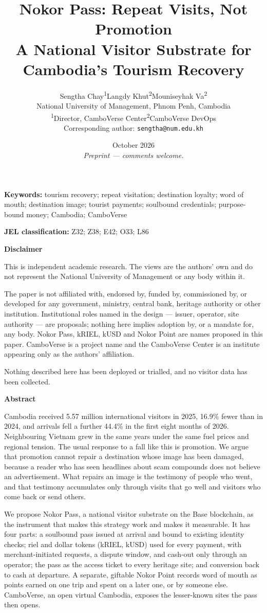 \documentclass[10pt,letterpaper,twocolumn]{article}
\title{\Large Nokor Pass: Repeat Visits, Not Promotion\\[0.3em]
  \large A National Visitor Substrate for Cambodia's Tourism Recovery}
\author{%
  Sengtha Chay\textsuperscript{1}\qquad Langdy Khut\textsuperscript{2}\qquad Mouniseyhak Va\textsuperscript{2}\\[0.6em]
  \normalsize National University of Management, Phnom Penh, Cambodia\\[0.6em]
  \small\textsuperscript{1}Director, CamboVerse Center\qquad \textsuperscript{2}CamboVerse DevOps\\[0.6em]
  \small Corresponding author: \texttt{sengtha@num.edu.kh}}
\date{\normalsize October 2026\\[0.2em]\emph{Preprint --- comments welcome.}}
\begin{document}
\twocolumn[
  \begin{@twocolumnfalse}
    \maketitle
    \vspace{0.5em}
  \end{@twocolumnfalse}
]
\thispagestyle{plain}

{\small
\noindent\textbf{Keywords:} tourism recovery; repeat visitation; destination
loyalty; word of mouth; destination image; tourist payments; soulbound
credentials; purpose-bound money; Cambodia; CamboVerse

\smallskip
\noindent\textbf{JEL classification:} Z32; Z38; E42; O33; L86

\medskip
\noindent\textbf{Disclaimer}\par
\noindent This is independent academic research. The views are the authors' own
and do not represent the National University of Management or any body within
it.

The paper is not affiliated with, endorsed by, funded by, commissioned by, or
developed for any government, ministry, central bank, heritage authority or
other institution. Institutional roles named in the design --- issuer, operator,
site authority --- are proposals; nothing here implies adoption by, or a mandate
for, any body. Nokor Pass, kRIEL, kUSD and Nokor Point are names proposed in this
paper. CamboVerse is a project name and the CamboVerse Center is an institute
appearing only as the authors' affiliation.

Nothing described here has been deployed or trialled, and no visitor data has
been collected.

\medskip
\noindent\textbf{Abstract}\par
\noindent Cambodia received 5.57 million international visitors in 2025, 16.9\%
fewer than in 2024, and arrivals fell a further 44.4\% in the first eight months
of 2026. Neighbouring Vietnam grew in the same years under the same fuel prices
and regional tension. The usual response to a fall like this is promotion. We
argue that promotion cannot repair a destination whose image has been damaged,
because a reader who has seen headlines about scam compounds does not believe
an advertisement. What repairs an image is the testimony of people who went,
and that testimony accumulates only through visits that go well and visitors
who come back or send others.

We propose Nokor Pass, a national visitor substrate on the Base blockchain, as
the instrument that makes this strategy work and makes it measurable. It has
four parts: a soulbound pass issued at arrival and bound to existing identity
checks; riel and dollar tokens (kRIEL, kUSD) used for every payment, with
merchant-initiated requests, a dispute window, and cash-out only through an
operator; the pass as the access ticket to every heritage site; and conversion
back to cash at departure. A separate, giftable Nokor Point records word of
mouth as points earned on one trip and spent on a later one, or by someone
else. CamboVerse, an open virtual Cambodia, exposes the lesser-known sites the
pass then opens.

}
\end{document}
